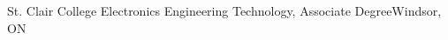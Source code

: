 \resumeSubheading
{St. Clair College}{}
{Electronics Engineering Technology, Associate Degree}{Windsor, ON}
